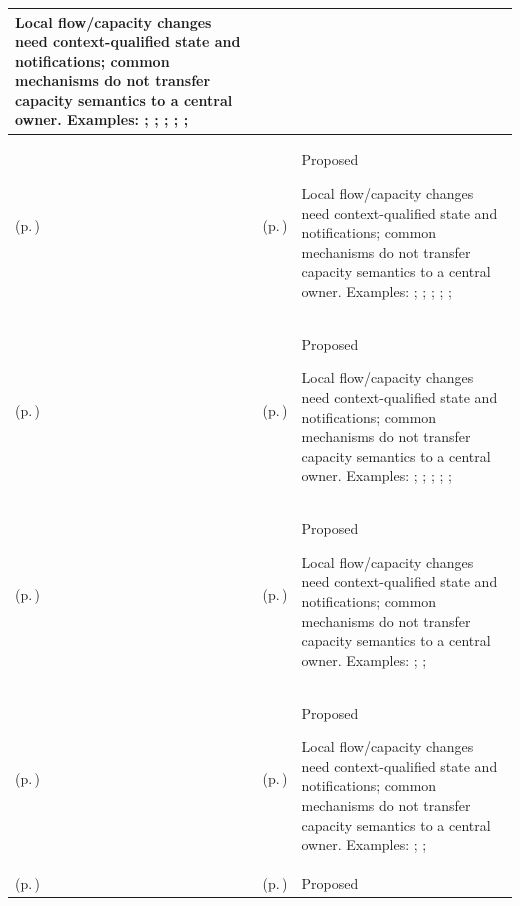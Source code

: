 \begin{longtable}{|>{\raggedright\arraybackslash}p{0.27\TableWidth}|>{\raggedright\arraybackslash}p{0.27\TableWidth}|>{\raggedright\arraybackslash}p{0.46\TableWidth}|}
Local flow/capacity changes need context-qualified state and notifications; common mechanisms do not transfer capacity semantics to a central owner. Examples: \nameref{feature:feat-hso-16}; \nameref{feature:feat-hso-17}; \nameref{function:manage-mobile-service-capacity}; \nameref{function:track-operational-staff-presence}; \nameref{service:staff-presence-telemetry-query}; \nameref{function:receive-mobile-visit-progression}\\\hline
\nameref{cap:bec-mobile-staff-management} (p.\,\pageref{cap:bec-mobile-staff-management}) & \nameref{cap:ec-03} (p.\,\pageref{cap:ec-03}) & Proposed

Local flow/capacity changes need context-qualified state and notifications; common mechanisms do not transfer capacity semantics to a central owner. Examples: \nameref{feature:feat-hso-16}; \nameref{feature:feat-hso-17}; \nameref{function:manage-mobile-service-capacity}; \nameref{function:track-operational-staff-presence}; \nameref{service:staff-presence-telemetry-query}; \nameref{function:receive-mobile-visit-progression}\\\hline
\nameref{cap:bec-mobile-staff-management} (p.\,\pageref{cap:bec-mobile-staff-management}) & \nameref{cap:ec-09} (p.\,\pageref{cap:ec-09}) & Proposed

Local flow/capacity changes need context-qualified state and notifications; common mechanisms do not transfer capacity semantics to a central owner. Examples: \nameref{feature:feat-hso-16}; \nameref{feature:feat-hso-17}; \nameref{function:manage-mobile-service-capacity}; \nameref{function:track-operational-staff-presence}; \nameref{service:staff-presence-telemetry-query}; \nameref{function:receive-mobile-visit-progression}\\\hline
\nameref{cap:bec-service-capacity-management} (p.\,\pageref{cap:bec-service-capacity-management}) & \nameref{cap:ec-02} (p.\,\pageref{cap:ec-02}) & Proposed

Local flow/capacity changes need context-qualified state and notifications; common mechanisms do not transfer capacity semantics to a central owner. Examples: \nameref{feature:feat-hso-15}; \nameref{function:aggregate-service-capacity-telemetry}; \nameref{service:regional-health-system-capacity-query}\\\hline
\nameref{cap:bec-service-capacity-management} (p.\,\pageref{cap:bec-service-capacity-management}) & \nameref{cap:ec-03} (p.\,\pageref{cap:ec-03}) & Proposed

Local flow/capacity changes need context-qualified state and notifications; common mechanisms do not transfer capacity semantics to a central owner. Examples: \nameref{feature:feat-hso-15}; \nameref{function:aggregate-service-capacity-telemetry}; \nameref{service:regional-health-system-capacity-query}\\\hline
\nameref{cap:bec-service-capacity-management} (p.\,\pageref{cap:bec-service-capacity-management}) & \nameref{cap:ec-09} (p.\,\pageref{cap:ec-09}) & Proposed


\end{longtable}
